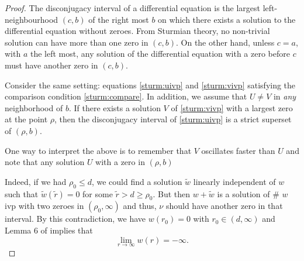 \begin{proof}
\donegroup
The disconjugacy interval of a differential equation is the largest
left-neighbourhood $(c, b)$ of the {\red right most} $b$ on which there
exists a solution to the differential equation without zeroes. From Sturmian
theory, no non-trivial solution can have more than one zero in $(c, b)$. On
the other hand, unless $c = a$, with $a$ the {\red left most}, any solution
of the differential equation with a zero before $c$ must have another zero
in $(c, b)$. 
\endgroup

    Consider the same setting: equations \eqref{sturm:uivp} and
    \eqref{sturm:vivp} satisfying the comparison condition
    \eqref{sturm:compare}. In addition, we assume that $U \neq V$ in \emph{any}
    neighborhood of $b$. If there exists a solution $V$ of \eqref{sturm:vivp}
    with a largest zero at the point $\rho$, then the disconjugacy interval of
    \eqref{sturm:uivp} is a strict superset of $(\rho, b)$. 

    One way to interpret the above is to remember that $V$ oscillates faster
    than $U$ and note that any solution $U$ with a zero in $(\rho, b)$ 

Indeed, if we had $\rho_0 \leq d$, we could find a solution $\tilde{w}$ linearly
independent of $w$ such that $\tilde{w}(\tilde{r}) = 0$ for some $\tilde{r} > d
\geq \rho_0$. But then $w + \tilde{w}$ is a solution of \# $w$ ivp with two
zeroes in $(\rho_0, \infty)$ and thus, $\nu$ should have another zero in {\red that
interval}. By this contradiction, we have $w(r_0) = 0$ with $r_0 \in (d,
\infty)$ and Lemma 6 of \cite[p.~249]{kwong} implies that
\[ \underset{r\to\infty}{\lim} w(r) = -\infty. \]



\end{proof}
